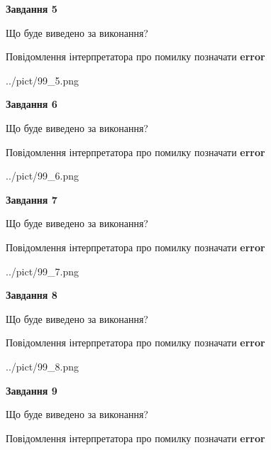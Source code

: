 \documentclass[11pt, ukrainian]{article}
\begin{document}
{\begin {large}
{\begin {center}\textbf{Завдання 5}\end {center}}\par
Що буде виведено за виконання? \par
Повідомлення інтерпретатора про помилку позначати \textbf{error}

\begin{center}
	{../pict/99_5.png}
\end{center}
\newpage

{\begin {center}\textbf{Завдання 6}\end {center}}\par
Що буде виведено за виконання? \par
Повідомлення інтерпретатора про помилку позначати \textbf{error}

\begin{center}
	{../pict/99_6.png}
\end{center}
\newpage

{\begin {center}\textbf{Завдання 7}\end {center}}\par
Що буде виведено за виконання? \par
Повідомлення інтерпретатора про помилку позначати \textbf{error}

\begin{center}
	{../pict/99_7.png}
\end{center}
\newpage

{\begin {center}\textbf{Завдання 8}\end {center}}\par
Що буде виведено за виконання? \par
Повідомлення інтерпретатора про помилку позначати \textbf{error}

\begin{center}
	{../pict/99_8.png}
\end{center}
\newpage

{\begin {center}\textbf{Завдання 9}\end {center}}\par
Що буде виведено за виконання? \par
Повідомлення інтерпретатора про помилку позначати \textbf{error}


\end{large}}
\end{document}

